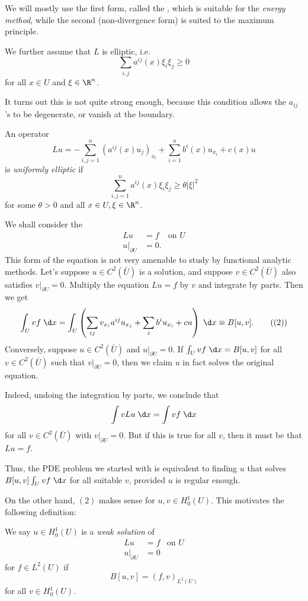 \documentclass[a4paper]{article}
\begin{document}
We will mostly use the first form, called the , which is suitable for the \emph{energy method}, while the second (non-divergence form) is suited to the maximum principle.

We further assume that $L$ is elliptic, i.e.
\[
  \sum_{i, j} a^{ij}(x) \xi_i \xi_j \geq 0
\]
for all $x \in U$ and $\xi \in \R^n$.

It turns out this is not quite strong enough, because this condition allows the $a_{ij}$'s to be degenerate, or vanish at the boundary.

\begin{defi}
  An operator
  \[
    Lu = - \sum_{i, j = 1}^n (a^{ij}(x) u_j)_{x_i} + \sum_{i = 1}^n b^i(x) u_{x_i} + c(x) u
  \]
  is \emph{uniformly elliptic} if
  \[
    \sum_{i, j = 1}^n a^{ij}(x) \xi_i \xi_j \geq \theta |\xi|^2
  \]
  for some $\theta > 0$ and all $x \in U, \xi \in\R^n$.
\end{defi}

We shall consider the 
\begin{align*}
  Lu &= f & \text{on }U\\
  u|_{\partial U} &= 0.
\end{align*}
This form of the equation is not very amenable to study by functional analytic methods. Let's suppose $u \in C^2(\bar{U})$ is a solution, and suppose $v \in C^2(\bar{U})$ also satisfies $v|_{\partial U} = 0$. Multiply the equation $Lu = f$ by $v$ and integrate by parts. Then we get
\[
  \int_U vf \;\d x = \int_U \left(\sum_{ij} v_{x_i} a^{ij} u_{x_j} + \sum_i b^i u_{x_i} + c u\right)\;\d x \equiv B[u, v].\tag{$(2)$}
\]
Conversely, suppose $u \in C^2(\bar{U})$ and $u|_{\partial U} = 0$. If $\int_U vf\;\d x = B[u, v]$ for all $v \in C^2(\bar{U})$ such that $v|_{\partial U} = 0$, then we claim $u$ in fact solves the original equation.

Indeed, undoing the integration by parts, we conclude that
\[
  \int v Lu \;\d x = \int v f\;\d x
\]
for all $v \in C^2(\bar{U})$ with $v|_{\partial U} = 0$. But if this is true for all $v$, then it must be that $Lu = f$.

Thus, the PDE problem we started with is equivalent to finding $u$ that solves $B[u, v] \int_U v f\;\d x$ for all suitable $v$, provided $u$ is regular enough.

On the other hand, $(2)$ makes sense for $u, v \in H_0^1(U)$. This motivates the following definition:

\begin{defi}
  We say $u \in H_0^1(U)$ is a \emph{weak solution} of
  \begin{align*}
    Lu &= f & \text{on }U\\
    u|_{\partial U} &= 0
  \end{align*}
  for $f \in L^2(U)$ if
  \[
    B[u, v] = (f, v)_{L^2(U)}
  \]
  for all $v \in H_0^1(U)$.
\end{defi}
\end{document}
